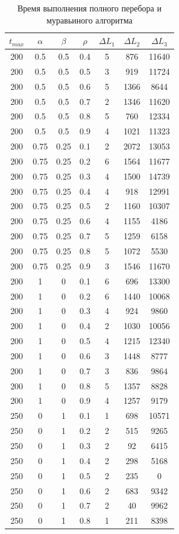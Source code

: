 \documentclass[12pt]{report}
\begin{document}
	\begin{table}[H]
		\begin{center}
			\caption[]{\label{tbl:only6} Время выполнения полного перебора и муравьиного алгоритма}
			\begin{tabular}{|c|c|c|c|c|c|c|}
				\hline
				$t_{max}$ & $\alpha$ & $\beta$&$\rho$ &$\Delta L_{1}$ & $\Delta L_{2}$ & $\Delta L_{3}$\\
				\hline
				200 & 0.5 & 0.5 & 0.4 & 5 & 876 & 11640 \\
				200 & 0.5 & 0.5 & 0.5 & 3 & 919 & 11724 \\
				200 & 0.5 & 0.5 & 0.6 & 5 & 1366 & 8644 \\
				200 & 0.5 & 0.5 & 0.7 & 2 & 1346 & 11620 \\
				200 & 0.5 & 0.5 & 0.8 & 5 & 760 & 12334 \\
				200 & 0.5 & 0.5 & 0.9 & 4 & 1021 & 11323 \\
				200 & 0.75 & 0.25 & 0.1 & 2 & 2072 & 13053 \\
				200 & 0.75 & 0.25 & 0.2 & 6 & 1564 & 11677 \\
				200 & 0.75 & 0.25 & 0.3 & 4 & 1500 & 14739 \\
				200 & 0.75 & 0.25 & 0.4 & 4 & 918 & 12991 \\
				200 & 0.75 & 0.25 & 0.5 & 2 & 1160 & 10307 \\
				200 & 0.75 & 0.25 & 0.6 & 4 & 1155 & 4186 \\
				200 & 0.75 & 0.25 & 0.7 & 5 & 1259 & 6158 \\
				200 & 0.75 & 0.25 & 0.8 & 5 & 1072 & 5530 \\
				200 & 0.75 & 0.25 & 0.9 & 3 & 1546 & 11670 \\
				200 & 1 & 0 & 0.1 & 6 & 696 & 13300 \\
				200 & 1 & 0 & 0.2 & 6 & 1440 & 10068 \\
				200 & 1 & 0 & 0.3 & 4 & 924 & 9860 \\
				200 & 1 & 0 & 0.4 & 2 & 1030 & 10056 \\
				200 & 1 & 0 & 0.5 & 4 & 1215 & 12340 \\
				200 & 1 & 0 & 0.6 & 3 & 1448 & 8777 \\
				200 & 1 & 0 & 0.7 & 3 & 836 & 9864 \\
				200 & 1 & 0 & 0.8 & 5 & 1357 & 8828 \\
				200 & 1 & 0 & 0.9 & 4 & 1257 & 9179 \\
				250 & 0 & 1 & 0.1 & 1 & 698 & 10571 \\
				250 & 0 & 1 & 0.2 & 2 & 515 & 9265 \\
				250 & 0 & 1 & 0.3 & 2 & 92 & 6415 \\
				250 & 0 & 1 & 0.4 & 2 & 298 & 5168 \\
				250 & 0 & 1 & 0.5 & 2 & 235 & 0 \\
				250 & 0 & 1 & 0.6 & 2 & 683 & 9342 \\
				250 & 0 & 1 & 0.7 & 2 & 40 & 9962 \\
				250 & 0 & 1 & 0.8 & 1 & 211 & 8398 \\
				\hline	
			\end{tabular}
		\end{center}
	\end{table}
\end{document}
